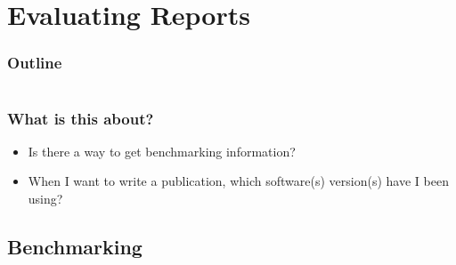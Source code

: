\section{Evaluating Reports}

\begin{frame}
    \frametitle{Outline}
    \begin{columns}[t]
        \begin{column}{.5\textwidth}
            \tableofcontents[sections={1-9},currentsection]
        \end{column}
        \begin{column}{.5\textwidth}
            \tableofcontents[sections={10-18},currentsection]
        \end{column}
    \end{columns}
\end{frame}

\begin{frame}
  \frametitle{What is this about?}
   \begin{question}[Questions]
   	 \begin{itemize}
        \item Is there a way to get benchmarking information?
        \item When I want to write a publication, which software(s) version(s) have I been using?
     \end{itemize}
   \end{question}
\end{frame}

\subsection{Benchmarking}

